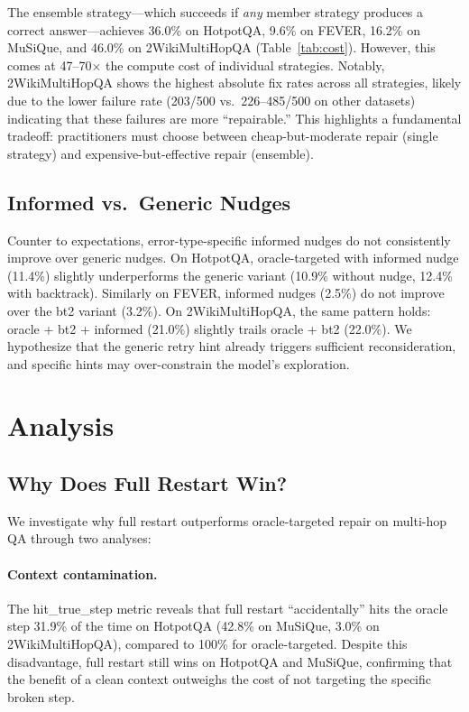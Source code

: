 \documentclass[letterpaper]{article}
\begin{document}
The ensemble strategy---which succeeds if \emph{any} member strategy produces a correct answer---achieves 36.0\% on HotpotQA, 9.6\% on FEVER, 16.2\% on MuSiQue, and 46.0\% on 2WikiMultiHopQA (Table~\ref{tab:cost}). However, this comes at 47--70$\times$ the compute cost of individual strategies. Notably, 2WikiMultiHopQA shows the highest absolute fix rates across all strategies, likely due to the lower failure rate (203/500 vs.\ 226--485/500 on other datasets) indicating that these failures are more ``repairable.'' This highlights a fundamental tradeoff: practitioners must choose between cheap-but-moderate repair (single strategy) and expensive-but-effective repair (ensemble).

\subsection{Informed vs.\ Generic Nudges}

Counter to expectations, error-type-specific informed nudges do not consistently improve over generic nudges. On HotpotQA, oracle-targeted with informed nudge (11.4\%) slightly underperforms the generic variant (10.9\% without nudge, 12.4\% with backtrack). Similarly on FEVER, informed nudges (2.5\%) do not improve over the bt2 variant (3.2\%). On 2WikiMultiHopQA, the same pattern holds: oracle + bt2 + informed (21.0\%) slightly trails oracle + bt2 (22.0\%). We hypothesize that the generic retry hint already triggers sufficient reconsideration, and specific hints may over-constrain the model's exploration.

\section{Analysis}

\subsection{Why Does Full Restart Win?}

We investigate why full restart outperforms oracle-targeted repair on multi-hop QA through two analyses:

\paragraph{Context contamination.} The hit\_true\_step metric reveals that full restart ``accidentally'' hits the oracle step 31.9\% of the time on HotpotQA (42.8\% on MuSiQue, 3.0\% on 2WikiMultiHopQA), compared to 100\% for oracle-targeted. Despite this disadvantage, full restart still wins on HotpotQA and MuSiQue, confirming that the benefit of a clean context outweighs the cost of not targeting the specific broken step.
\end{document}
